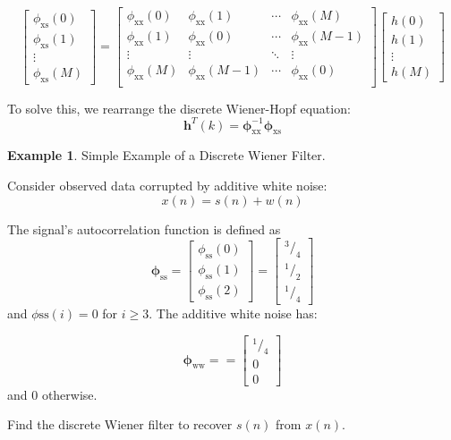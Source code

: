 \documentclass[12pt]{book}
\theoremstyle{definition}
\newtheorem{exmp}{Example}[chapter]
\newcommand*\rfrac[2]{{}^{#1}\!/_{#2}}
\begin{document}
\begin{equation*}
    \begin{bmatrix}
        \phi_\mathrm{xs}(0) \\
        \phi_\mathrm{xs}(1) \\
        \vdots \\
        \phi_\mathrm{xs}(M)
    \end{bmatrix}
    =
    \begin{bmatrix}
        \phi_\mathrm{xx}(0) & \phi_\mathrm{xx}(1) & \cdots & \phi_\mathrm{xx}(M) \\
       \phi_\mathrm{xx}(1) & \phi_\mathrm{xx}(0) & \cdots & \phi_\mathrm{xx}(M-1)  \\
        \vdots & \vdots & \ddots & \vdots \\
        \phi_\mathrm{xx}(M) & \phi_\mathrm{xx}(M-1) & \cdots & \phi_\mathrm{xx}(0) \\
    \end{bmatrix}
    \begin{bmatrix}
        h(0)\\
        h(1)\\
        \vdots \\
        h(M)
    \end{bmatrix}
\end{equation*}

To solve this, we rearrange the discrete Wiener-Hopf equation:
\[
\boldsymbol{h}^T(k)= \boldsymbol{\phi}_\mathrm{xx}^{-1} \boldsymbol{\phi}_\mathrm{xs}
\]

\begin{tcolorbox}
    \begin{exmp}{Simple Example of a Discrete Wiener Filter.}
    
    Consider observed data corrupted by additive white noise:
    \[
    x(n) = s(n) + w(n)
    \]
    
    The signal's autocorrelation function is defined as
\[
\boldsymbol{\phi}_\mathrm{ss} = 
    \begin{bmatrix}
        \phi_\mathrm{ss}(0) \\
        \phi_\mathrm{ss}(1) \\
        \phi_\mathrm{ss}(2)
    \end{bmatrix}
    = 
    \begin{bmatrix}
        \rfrac{3}{4}\\
        \rfrac{1}{2}\\
        \rfrac{1}{4}
    \end{bmatrix}
\]
and \(\phi\mathrm{ss}(i) = 0 \) for \(i \ge 3\). The additive white noise has:

\[
\boldsymbol{\phi}_\mathrm{ww} = 
    = 
    \begin{bmatrix}
        \rfrac{1}{4}\\
        0\\
        0
    \end{bmatrix}
\]
and 0 otherwise.

    \end{exmp}

Find the discrete Wiener filter to recover \(s(n)\) from \(x(n)\).

\end{tcolorbox}
\end{document}
